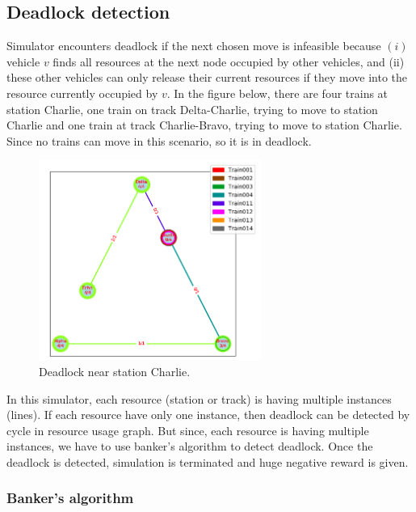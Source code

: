 \subsection{Deadlock detection}
Simulator encounters deadlock if the next chosen move is
infeasible because $(i)$ vehicle $v$ finds all resources at the
next node occupied by other vehicles, and (ii) these other
vehicles can only release their current resources if they
move into the resource currently occupied by $v$. 
In the figure below, there are four trains at station Charlie, one train on track Delta-Charlie, trying to move to station Charlie 
and one train at track Charlie-Bravo, trying to move to station Charlie. Since no trains can move in this scenario, so it is in deadlock.

\begin{figure}[h]
    \centering
    \includegraphics[width=0.65\textwidth]{deadlock}
    \caption{ Deadlock near station Charlie.  }
    \label{image-myimage6}
\end{figure}

In this simulator, each resource (station or track) is having multiple instances
(lines). If each resource have only one instance, then deadlock can be detected by cycle in resource 
usage graph. But since, each resource is having multiple instances, we have to use banker's algorithm to detect deadlock.
Once the deadlock is detected, simulation is terminated and huge negative reward is given.

\subsubsection{Banker's algorithm}

